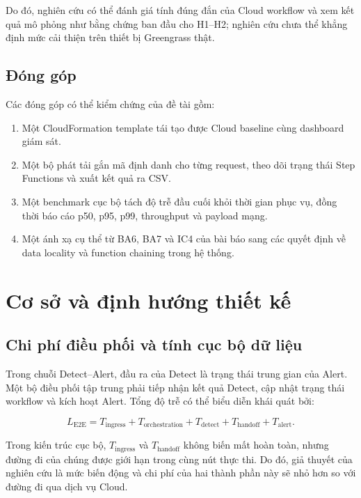 Do đó, nghiên cứu có thể đánh giá tính đúng đắn của Cloud workflow và xem kết quả
mô phỏng như bằng chứng ban đầu cho H1--H2; nghiên cứu chưa thể khẳng định mức cải
thiện trên thiết bị Greengrass thật.

\subsection{Đóng góp}

Các đóng góp có thể kiểm chứng của đề tài gồm:

\begin{enumerate}
    \item Một CloudFormation template tái tạo được Cloud baseline cùng dashboard
    giám sát.
    \item Một bộ phát tải gắn mã định danh cho từng request, theo dõi trạng thái
    Step Functions và xuất kết quả ra CSV.
    \item Một benchmark cục bộ tách độ trễ đầu cuối khỏi thời gian phục vụ, đồng
    thời báo cáo p50, p95, p99, throughput và payload mạng.
    \item Một ánh xạ cụ thể từ BA6, BA7 và IC4 của bài báo sang các quyết định về
    data locality và function chaining trong hệ thống.
\end{enumerate}


\section{Cơ sở và định hướng thiết kế}

\subsection{Chi phí điều phối và tính cục bộ dữ liệu}

Trong chuỗi Detect--Alert, đầu ra của Detect là trạng thái trung gian của Alert.
Một bộ điều phối tập trung phải tiếp nhận kết quả Detect, cập nhật trạng thái
workflow và kích hoạt Alert. Tổng độ trễ có thể biểu diễn khái quát bởi:

\begin{equation}
L_{\mathrm{E2E}} = T_{\mathrm{ingress}} + T_{\mathrm{orchestration}}
+ T_{\mathrm{detect}} + T_{\mathrm{handoff}} + T_{\mathrm{alert}}.
\label{eq:latency-components}
\end{equation}

Trong kiến trúc cục bộ, $T_{\mathrm{ingress}}$ và $T_{\mathrm{handoff}}$ không biến
mất hoàn toàn, nhưng đường đi của chúng được giới hạn trong cùng nút thực thi. Do
đó, giả thuyết của nghiên cứu là mức biến động và chi phí của hai thành phần này sẽ
nhỏ hơn so với đường đi qua dịch vụ Cloud.

